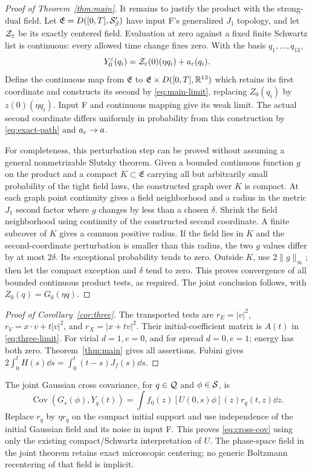 \begin{proof}[Proof of Theorem~\ref{thm:main}]
It remains to justify the product with the strong-dual field. Let
$\mathfrak E=D([0,T],\mathcal S'_\beta)$ have input F's generalized $J_1$
topology, and let $\mathcal Z_\varepsilon$ be its exactly centered field.
Evaluation at zero against a fixed finite Schwartz list is continuous:
every allowed time change fixes zero. With the basis $q_1,\ldots,q_{13}$,
\[
 Y_0^\varepsilon(q_i)=\mathcal Z_\varepsilon(0)(\eta q_i)+a_\varepsilon(q_i).
\]
Define the continuous map from $\mathfrak E$ to
$\mathfrak E\times D([0,T],\mathbb R^{13})$ which retains its first coordinate
and constructs its second by \eqref{eq:main-limit}, replacing
$Z_0(q_i)$ by $z(0)(\eta q_i)$. Input F and continuous mapping give its
weak limit. The actual second coordinate differs uniformly in probability
from this construction by \eqref{eq:exact-path} and
$a_\varepsilon\to a$.

For completeness, this perturbation step can be proved without assuming a
general nonmetrizable Slutsky theorem. Given a bounded continuous function
$g$ on the product and a compact $K\subset\mathfrak E$ carrying all but
arbitrarily small probability of the tight field laws, the constructed
graph over $K$ is compact. At each graph point continuity gives a field
neighborhood and a radius in the metric $J_1$ second factor where $g$
changes by less than a chosen $\delta$. Shrink the field neighborhood
using continuity of the constructed second coordinate. A finite subcover
of $K$ gives a common positive radius. If the field lies in $K$ and the
second-coordinate perturbation is smaller than this radius, the two
$g$ values differ by at most $2\delta$. Its exceptional probability
tends to zero. Outside $K$, use $2\|g\|_\infty$; then let the compact
exception and $\delta$ tend to zero. This proves convergence of all
bounded continuous product tests, as required. The joint conclusion
follows, with $Z_0(q)=G_0(\eta q)$.
\end{proof}

\begin{proof}[Proof of Corollary~\ref{cor:three}]
The transported tests are
$r_E=|v|^2$, $r_V=x\cdot v+t|v|^2$, and $r_X=|x+tv|^2$.
Their initial-coefficient matrix is $A(t)$ in \eqref{eq:three-limit}.
For virial $d=1,e=0$, and for spread $d=0,e=1$; energy has both zero.
Theorem~\ref{thm:main} gives all assertions. Fubini gives
$2\int_0^tH(s)\dd s=\int_0^t(t-s)J_f(s)\dd s$.
\end{proof}

The joint Gaussian cross covariance, for $q\in\mathcal Q$ and
$\phi\in\mathcal S$, is
\begin{equation}\label{eq:cross-cov}
 \operatorname{Cov}(G_s(\phi),Y_q(t))
           =\int f_0(z)[U(0,s)\phi](z)r_q(t,z)\dd z.
\end{equation}
Replace $r_q$ by $\eta r_q$ on the compact initial support and use
independence of the initial Gaussian field and its noise in input F.
This proves \eqref{eq:cross-cov} using only the existing
compact/Schwartz interpretation of $U$. The phase-space field in the
joint theorem retains exact microscopic centering; no generic
Boltzmann recentering of that field is implicit.

